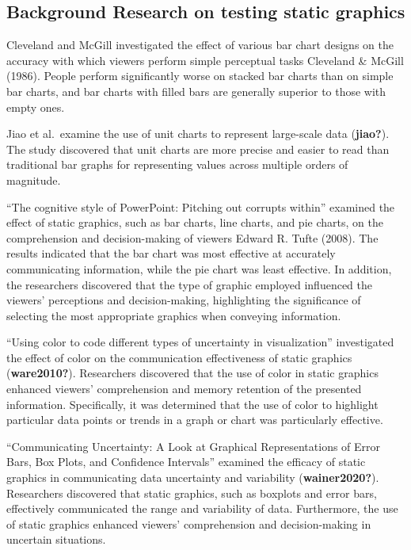 \documentclass[print]{nuthesis}
\begin{document}
\hypertarget{background-research-on-testing-static-graphics}{%
\subsection{Background Research on testing static graphics}\label{background-research-on-testing-static-graphics}}

Cleveland and McGill investigated the effect of various bar chart designs on the accuracy with which viewers perform simple perceptual tasks Cleveland \& McGill (1986).
People perform significantly worse on stacked bar charts than on simple bar charts, and bar charts with filled bars are generally superior to those with empty ones.

Jiao et al.~examine the use of unit charts to represent large-scale data (\textbf{jiao?}).
The study discovered that unit charts are more precise and easier to read than traditional bar graphs for representing values across multiple orders of magnitude.

``The cognitive style of PowerPoint: Pitching out corrupts within'' examined the effect of static graphics, such as bar charts, line charts, and pie charts, on the comprehension and decision-making of viewers Edward R. Tufte (2008).
The results indicated that the bar chart was most effective at accurately communicating information, while the pie chart was least effective.
In addition, the researchers discovered that the type of graphic employed influenced the viewers' perceptions and decision-making, highlighting the significance of selecting the most appropriate graphics when conveying information.

``Using color to code different types of uncertainty in visualization'' investigated the effect of color on the communication effectiveness of static graphics (\textbf{ware2010?}).
Researchers discovered that the use of color in static graphics enhanced viewers' comprehension and memory retention of the presented information.
Specifically, it was determined that the use of color to highlight particular data points or trends in a graph or chart was particularly effective.

``Communicating Uncertainty: A Look at Graphical Representations of Error Bars, Box Plots, and Confidence Intervals'' examined the efficacy of static graphics in communicating data uncertainty and variability (\textbf{wainer2020?}).
Researchers discovered that static graphics, such as boxplots and error bars, effectively communicated the range and variability of data.
Furthermore, the use of static graphics enhanced viewers' comprehension and decision-making in uncertain situations.
\end{document}
